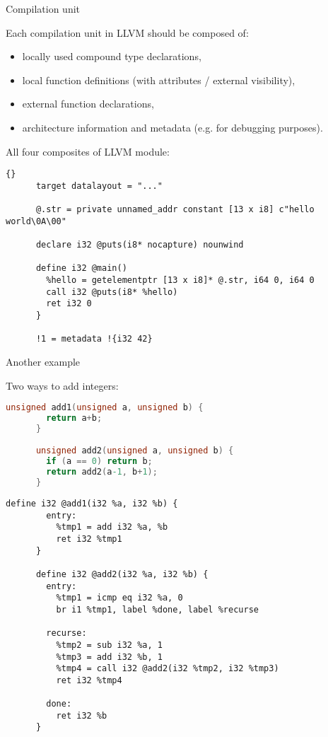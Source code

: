\documentclass[8pt]{beamer}
\begin{document}
\begin{frame}[fragile]{Compilation unit}
  \begin{block}{Each compilation unit in LLVM should be composed of:}
    \begin{itemize}
      \item locally used compound type declarations,
      \item local function definitions (with attributes / external visibility),
      \item external function declarations,
      \item architecture information and metadata (e.g. for debugging
        purposes).
    \end{itemize}
  \end{block}

  \begin{exampleblock}{All four composites of LLVM module:}
    \begin{lstlisting}{}
      target datalayout = "..."

      @.str = private unnamed_addr constant [13 x i8] c"hello world\0A\00"

      declare i32 @puts(i8* nocapture) nounwind

      define i32 @main() 
        %hello = getelementptr [13 x i8]* @.str, i64 0, i64 0
        call i32 @puts(i8* %hello)
        ret i32 0
      }

      !1 = metadata !{i32 42}
    \end{lstlisting}
  \end{exampleblock}
\end{frame}

\begin{frame}[fragile]{Another example}
  \begin{exampleblock}{Two ways to add integers:}
    \begin{lstlisting}[language=C,basicstyle=\tiny\ttfamily]
      unsigned add1(unsigned a, unsigned b) {
        return a+b;
      }

      unsigned add2(unsigned a, unsigned b) {
        if (a == 0) return b;
        return add2(a-1, b+1);
      }
    \end{lstlisting}

    \begin{lstlisting}[basicstyle=\tiny\ttfamily,]
      define i32 @add1(i32 %a, i32 %b) {
        entry:
          %tmp1 = add i32 %a, %b
          ret i32 %tmp1
      }

      define i32 @add2(i32 %a, i32 %b) {
        entry:
          %tmp1 = icmp eq i32 %a, 0
          br i1 %tmp1, label %done, label %recurse

        recurse:
          %tmp2 = sub i32 %a, 1
          %tmp3 = add i32 %b, 1
          %tmp4 = call i32 @add2(i32 %tmp2, i32 %tmp3)
          ret i32 %tmp4

        done:
          ret i32 %b
      }
    \end{lstlisting}
  \end{exampleblock}
\end{frame}
\end{document}
